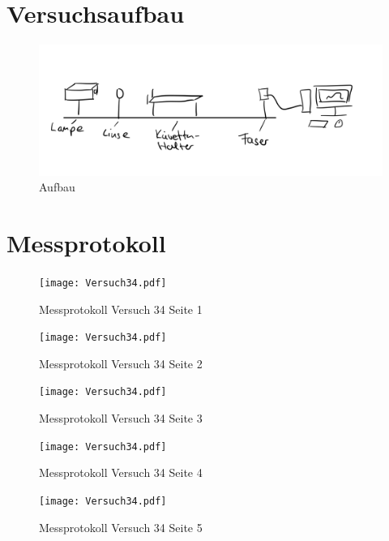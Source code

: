 \section{Versuchsaufbau}
\begin{figure}[h!]
    \centering
    \includegraphics[page=1, width=1\textwidth,]{IMG_CCB29F6F352C-1.jpeg}
    \caption{Aufbau}
\end{figure}
\newpage
\section{Messprotokoll}
\begin{figure}[h!]
    \centering
    \texttt{[image: Versuch34.pdf]}
    \caption{Messprotokoll Versuch 34 Seite 1}
\end{figure}
\newpage
\begin{figure}[h!]
    \centering
    \texttt{[image: Versuch34.pdf]}
    \caption{Messprotokoll Versuch 34 Seite 2}
\end{figure}
\newpage
\begin{figure}[h!]
    \centering
    \texttt{[image: Versuch34.pdf]}
    \caption{Messprotokoll Versuch 34  Seite 3}
\end{figure}
\newpage
\begin{figure}[h!]
    \centering
    \texttt{[image: Versuch34.pdf]}
    \caption{Messprotokoll Versuch 34 Seite 4}
\end{figure}
\newpage
\begin{figure}[h!]
    \centering
    \texttt{[image: Versuch34.pdf]}
    \caption{Messprotokoll Versuch 34  Seite 5}
\end{figure}
\newpage